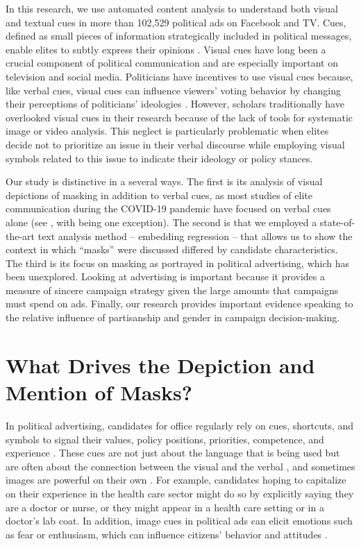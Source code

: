 In this research, we use automated content analysis to understand both visual and textual cues in more than 102,529 political ads on Facebook and TV. Cues, defined as small pieces of information strategically included in political messages, enable elites to subtly express their opinions \parencite{darmofal2005elite}. Visual cues have long been a crucial component of political communication \parencite{schill2012visual} and are especially important on television and social media. Politicians have incentives to use visual cues because, like verbal cues, visual cues can influence viewers' voting behavior by changing their perceptions of politicians' ideologies \parencite{dan_visual_2021}. However, scholars traditionally have overlooked visual cues in their research because of the lack of tools for systematic image or video analysis. This neglect is particularly problematic when elites decide not to prioritize an issue in their verbal discourse while employing visual symbols related to this issue to indicate their ideology or policy stances.

Our study is distinctive in a several ways. The first is its analysis of visual depictions of masking in addition to verbal cues, as most studies of elite communication during the COVID-19 pandemic have focused on verbal cues alone (see \cite{green2020elusive, scoville2022mask, neumann2023politicizing}, with \cite{holman_masking_nodate} being one exception). The second is that we employed a state-of-the-art text analysis method -- embedding regression -- that allows us to show the context in which ``masks'' were discussed differed by candidate characteristics. The third is its focus on masking as portrayed in political advertising, which has been unexplored. Looking at advertising is important because it provides a measure of sincere campaign strategy given the large amounts that campaigns must spend on ads. Finally, our research provides  important evidence speaking to the relative influence of partisanship and gender in campaign decision-making.

\section*{What Drives the Depiction and Mention of Masks?}
In political advertising, candidates for office regularly rely on cues, shortcuts, and symbols to signal their values, policy positions, priorities, competence, and experience \parencite{valentino_cues_2002,schmuck_effects_2017,FFR_2021,neumann2022body}. These cues are not just about the language that is being used but are often about the connection between the visual and the verbal \parencite{valentino2004impact, schmuck_effects_2017, swigger2012you}, and sometimes images are powerful on their own \parencite{FFR_2021,dan_visual_2021}. For example, candidates hoping to capitalize on their experience in the health care sector might do so by explicitly saying they are a doctor or nurse, or they might appear in a health care setting or in a doctor's lab coat. In addition, image cues in political ads can elicit emotions such as fear or enthusiasm, which can influence citizens' behavior and attitudes \parencite{brader2005striking}.


